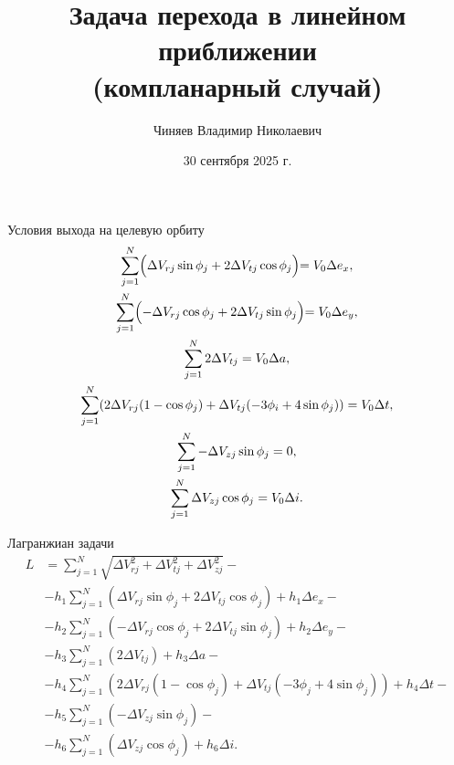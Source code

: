 \documentclass[9pt]{beamer}
\author[Автор]{Чиняев Владимир Николаевич}
\title{Задача перехода в линейном приближении \\ (компланарный случай)}
\institute[]{Московский физико технический институт}
\date{30 сентября 2025 г.}
\begin{document}
\begin{frame}
\titlepage
\end{frame}

\begin{frame}{Условия выхода на целевую орбиту}
\begin{gather*}
    \sum_{j=1}^{N} \Bigl( \Delta V_{rj} \sin \phi_j + 2 \Delta V_{tj} \cos \phi_j \Bigl) = V_0 \Delta e_x, \\
    \sum_{j=1}^{N} \Bigl( -\Delta V_{rj} \cos \phi_j + 2 \Delta V_{tj} \sin \phi_j \Bigl) = V_0 \Delta e_y, \\
    \sum_{j=1}^{N} 2 \Delta V_{tj} = V_0 \Delta a, \\
    \sum_{j=1}^{N} (2 \Delta V_{rj} (1 - \cos \phi_j) + \Delta V_{tj} (-3 \phi_i + 4 \sin \phi_j)) = V_0 \Delta t, \\
    \sum_{j=1}^{N} -\Delta V_{zj} \sin \phi_j = 0, \\
    \sum_{j=1}^{N} \Delta V_{zj} \cos \phi_j = V_0 \Delta i.
\end{gather*}
\end{frame}

\begin{frame}{Лагранжиан задачи}
\begin{equation*}
    \begin{aligned}
        L &= \sum_{j=1}^N \sqrt{\Delta V_{rj}^2 + \Delta V_{tj}^2 + \Delta V_{zj}^2} - \\
        &- h_1 \sum_{j=1}^N \left( \Delta V_{rj} \sin \phi_j + 2 \Delta V_{tj} \cos \phi_j \right) + h_1 \Delta e_x - \\
        &- h_2 \sum_{j=1}^N \left(- \Delta V_{rj} \cos \phi_j + 2 \Delta V_{tj} \sin \phi_j \right) + h_2 \Delta e_y - \\
        &- h_3 \sum_{j=1}^N \left( 2 \Delta V_{tj} \right) + h_3 \Delta a - \\
        &- h_4 \sum_{j=1}^N \left( 2 \Delta V_{rj} (1 - \cos \phi_j) + \Delta V_{tj} (-3 \phi_j + 4 \sin \phi_j) \right) + h_4 \Delta t - \\
        &- h_5 \sum_{j=1}^N \left( -\Delta V_{zj} \sin \phi_j \right) - \\
        &- h_6 \sum_{j=1}^N \left( \Delta V_{zj} \cos \phi_j \right) + h_6 \Delta i.
    \end{aligned}
\end{equation*}
\end{frame}
\end{document}
